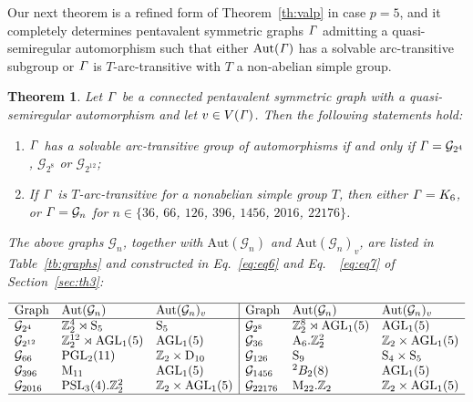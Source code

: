 \documentclass[12pt,reqno]{amsart}
\newcommand\A{\mathrm{A}} \newcommand\AGL{\mathrm{AGL}} \newcommand\AGammaL{\mathrm{A\Gamma L}} \newcommand\Alt{\mathrm{Alt}} \newcommand\ASL{\mathrm{ASL}} \newcommand\ASigmaL{\mathrm{A \Sigma L}} \newcommand\Aut{\mathrm{Aut}}
\newcommand\D{\mathrm{D}}   \def\det{{\sf det}}
\newcommand\M{\mathrm{M}} \newcommand{\magma}{{\sc Magma}} \renewcommand \mod{{\rm mod~}}
\newcommand\mz{\mathbb{Z}}
\newcommand{\cG}{\mathcal{G}}
\numberwithin {equation} {section}
\newtheorem{theorem}{Theorem}[section]
\begin{document}

Our next theorem is a refined form of Theorem~\ref{th:valp} in case $p=5$, and it completely determines pentavalent symmetric graphs ${\it \Gamma}$ admitting a quasi-semiregular automorphism such that either $\Aut(\Ga)$ has a solvable arc-transitive subgroup or ${\it \Gamma}$ is $T$-arc-transitive with $T$ a non-abelian simple group.

\begin{theorem}\label{th:val5}
Let ${\it \Gamma}$ be a connected pentavalent symmetric graph with a quasi-semiregular automorphism and let $v\in V({\it \Gamma})$. Then the  following  statements hold:
\begin{enumerate}[\rm (1)]
 \item ${\it \Gamma}$ has a solvable arc-transitive group of automorphisms if and only if $\Ga=\cG_{2^4}$, $\cG_{2^8}$ or $\cG_{2^{12}}$;
\item If ${\it \Gamma}$ is $T$-arc-transitive for a nonabelian simple group $T$, then either ${\it \Gamma}=K_{6}$, or $\Ga=\cG_{n}$ for $n \in  \{36$, $66$, $126$, $396$, $1456$, $2016$, $22176\}$.
\end{enumerate}

\smallskip
The above graphs $\cG_n$, together with $\Aut(\cG_n)$ and $\Aut(\cG_n)_v$,  are listed in Table~\ref{tb:graphs} and constructed in Eq.~\ref{eq:eq6} and Eq.~~\ref{eq:eq7} of Section~\ref{sec:th3}:

\begin{table}[htb]
\caption{Information for $\cG_n$, $\Aut(\cG_n)$ and $\Aut(\cG_n)_v$} \label{tb:graphs}
\[
 \begin{array}{  l  ll|lll  } \hline
\mbox{Graph} & \Aut(\cG_n) & \Aut(\cG_n)_v & \mbox{Graph} & \Aut(\cG_n) & \Aut(\cG_n)_v   \\ \hline
\cG_{2^4} & \ZZ_2^4\rtimes\Sy_5 &\Sy_5  & \cG_{2^8} & \ZZ_2^8\rtimes \AGL_1(5) & \AGL_1(5) \\
\cG_{2^{12}} & \ZZ_2^{12}\rtimes \AGL_1(5) &  \AGL_1(5)  & \cG_{36}& \A_6.\mz_2^2& \ZZ_2 \times \AGL_1(5) \\
\cG_{66} &\PGL_2(11) &\ZZ_2 \times \D_{10} &
\cG_{126} &\Sy_9 &\Sy_4 \times\Sy_5\\
\cG_{396} &  \M_{11} & \AGL_1(5)&
\cG_{1456} & {}^2B_2(8) & \AGL_1(5)\\
 \cG_{2016} &\PSL_3(4).\mz_2^2 & \ZZ_2 \times \AGL_1(5) &
\cG_{22176} &\M_{22}.\mz_2 &\ZZ_2 \times \AGL_1(5) \\
 \hline
 \end{array}
\]
\end{table}
\end{theorem}
\end{document}
